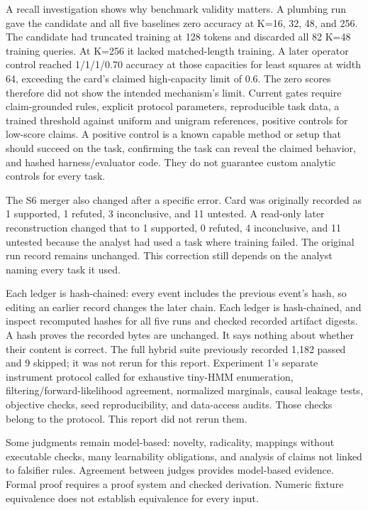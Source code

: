 A recall investigation shows why benchmark validity matters. A plumbing run gave the candidate and all five baselines zero accuracy at K=16, 32, 48, and 256. The candidate had truncated training at 128 tokens and discarded all 82 K=48 training queries. At K=256 it lacked matched-length training. A later operator control reached 1/1/1/0.70 accuracy at those capacities for least squares at width 64, exceeding the card's claimed high-capacity limit of 0.6. The zero scores therefore did not show the intended mechanism's limit. Current gates require claim-grounded rules, explicit protocol parameters, reproducible task data, a trained threshold against uniform and unigram references, positive controls for low-score claims. A positive control is a known capable method or setup that should succeed on the task, confirming the task can reveal the claimed behavior, and hashed harness/evaluator code. They do not guarantee custom analytic controls for every task.

The S6 merger also changed after a specific error. Card  was originally recorded as 1 supported, 1 refuted, 3 inconclusive, and 11 untested. A read-only later reconstruction changed that to 1 supported, 0 refuted, 4 inconclusive, and 11 untested because the analyst had used a task where training failed. The original run record remains unchanged. This correction still depends on the analyst naming every task it used.

Each ledger is hash-chained: every event includes the previous event's hash, so editing an earlier record changes the later chain. Each ledger is hash-chained, and inspect recomputed hashes for all five runs and checked recorded artifact digests. A hash proves the recorded bytes are unchanged. It says nothing about whether their content is correct. The full hybrid suite previously recorded 1,182 passed and 9 skipped; it was not rerun for this report. Experiment 1's separate instrument protocol called for exhaustive tiny-HMM enumeration, filtering/forward-likelihood agreement, normalized marginals, causal leakage tests, objective checks, seed reproducibility, and data-access audits. Those checks belong to the protocol. This report did not rerun them.

Some judgments remain model-based: novelty, radicality, mappings without executable checks, many learnability obligations, and analysis of claims not linked to falsifier rules. Agreement between judges provides model-based evidence. Formal proof requires a proof system and checked derivation. Numeric fixture equivalence does not establish equivalence for every input.

